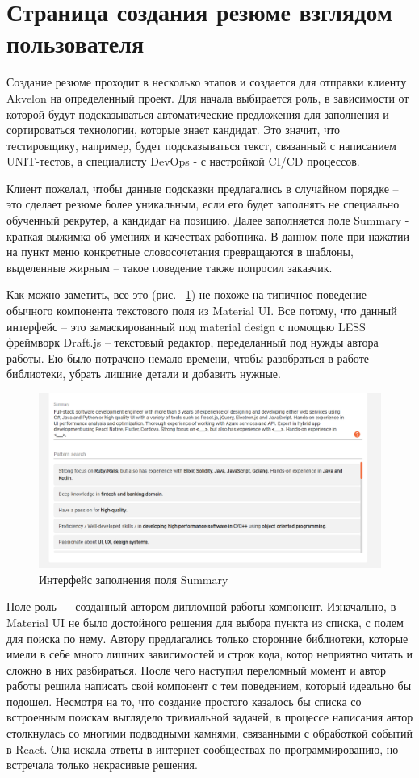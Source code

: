 \documentclass[14pt, a4paper]{diplom}
\begin{document}
\section{Страница создания резюме взглядом пользователя}
Создание резюме проходит в несколько этапов и создается для отправки клиенту Akvelon на определенный проект.
Для начала выбирается роль, в зависимости от которой будут подсказываться автоматические предложения для заполнения и сортироваться технологии, которые знает кандидат. Это значит, что тестировщику, например, будет подсказываться текст,
связанный с написанием UNIT-тестов, а специалисту DevOps - с настройкой CI/CD процессов.

Клиент пожелал, чтобы данные подсказки предлагались в случайном порядке -- это сделает резюме более уникальным, если его будет заполнять не специально обученный рекрутер, а кандидат на позицию.
Далее заполняется поле Summary - краткая выжимка об умениях и качествах работника. В данном поле при нажатии на пункт меню конкретные словосочетания превращаются в шаблоны, выделенные жирным -- такое поведение также попросил заказчик.

Как можно заметить, все это (рис. ~\ref{7}) не похоже на типичное поведение обычного компонента текстового поля из Material UI. Все потому, что данный интерфейс -- это
замаскированный под material design с помощью LESS фреймворк Draft.js -- текстовый редактор, переделанный под нужды автора работы. Ею было потрачено немало времени, чтобы разобраться в работе библиотеки,
убрать лишние детали и добавить нужные.

\begin{figure}[!ht]
\centering
\includegraphics[width=1\textwidth]{resources/summary.png}
\caption{Интерфейс заполнения поля Summary}
\label{7}
\end{figure}

Поле роль — созданный автором дипломной работы компонент. Изначально, в Material UI не было достойного решения для выбора пункта из списка, с полем для поиска по нему.
Автору предлагались только сторонние библиотеки, которые имели в себе много лишних зависимостей и строк кода, котор неприятно читать и сложно в них разбираться.
После чего наступил переломный момент и автор работы решила написать свой компонент с тем поведением, который идеально бы подошел. Несмотря на то, что создание простого казалось бы списка со встроенным поискам выглядело тривиальной задачей,
в процессе написания автор столкнулась со многими подводными камнями, связанными с обработкой событий в React. Она искала ответы в интернет сообществах по программированию,
но встречала только некрасивые решения.
\end{document}
